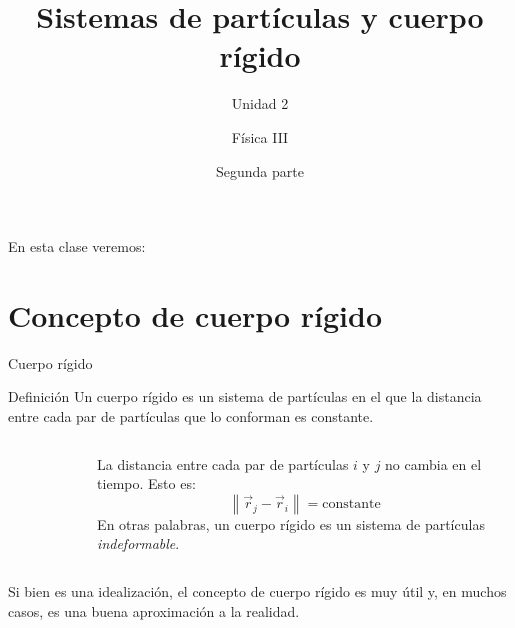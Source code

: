 \documentclass[11pt,handout,aspectratio=1610]{beamer}
\title{Sistemas de partículas y cuerpo rígido}
\subtitle{Unidad 2}
\author{Física III}
\institute{Instituto de Tecnología e Ingeniería \\ \vspace{0.25cm} Universidad Nacional de Hurlingham}
\date{Segunda parte}
\newcommand{\norm}[1]{\left\lVert #1 \right\rVert }
\newcommand{\vs}{\vspace{0.3cm}}
\begin{document}
\renewcommand{\tablename}{Tabla}

\frame{\titlepage}

\begin{frame}{En esta clase veremos:}
    \tableofcontents
\end{frame}

\section{Concepto de cuerpo rígido}

\begin{frame}{Cuerpo rígido}

\begin{block}{Definición}
    Un cuerpo rígido es un sistema de partículas en el que la distancia entre cada par de partículas que lo conforman es constante.
\end{block}

\begin{columns}
    \begin{column}{0.5\textwidth}
        \begin{figure}
            \centering
        \end{figure}
    \end{column}
    \begin{column}{0.5\textwidth}
        La distancia entre cada par de partículas $i$ y $j$ no cambia en el tiempo. Esto es: $$\norm{\vec{r}_j - \vec{r}_i} = \text{constante}$$ En otras palabras, un cuerpo rígido es un sistema de partículas \emph{indeformable}.
    \end{column}
\end{columns}

\vs

Si bien es una idealización, el concepto de cuerpo rígido es muy útil y, en muchos casos, es una buena aproximación a la realidad.

\end{frame}
\end{document}
